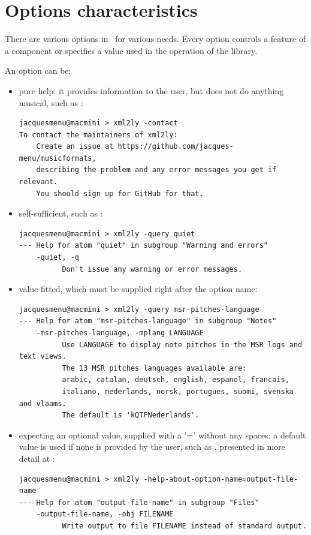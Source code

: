 \section{Options characteristics}\label{Options characteristics}

There are various options in \mf\ for various needs. Every option controls a feature of a component or specifies a value used in the operation of the library.

An option can be:
\begin{itemize}
\item pure help:
it provides information to the user, but does not do anything musical, such as :
\begin{lstlisting}[language=Terminal]
jacquesmenu@macmini > xml2ly -contact
To contact the maintainers of xml2ly:
    Create an issue at https://github.com/jacques-menu/musicformats,
    describing the problem and any error messages you get if relevant.
    You should sign up for GitHub for that.
\end{lstlisting}

\item self-sufficient, such as :
\begin{lstlisting}[language=Terminal]
jacquesmenu@macmini > xml2ly -query quiet
--- Help for atom "quiet" in subgroup "Warning and errors"
    -quiet, -q
          Don't issue any warning or error messages.
\end{lstlisting}

\item value-fitted, which must be supplied right after the option name:
\begin{lstlisting}[language=Terminal]
jacquesmenu@macmini > xml2ly -query msr-pitches-language
--- Help for atom "msr-pitches-language" in subgroup "Notes"
    -msr-pitches-language, -mplang LANGUAGE
          Use LANGUAGE to display note pitches in the MSR logs and text views.
          The 13 MSR pitches languages available are:
          arabic, catalan, deutsch, english, espanol, francais,
          italiano, nederlands, norsk, portugues, suomi, svenska and vlaams.
          The default is 'kQTPNederlands'.
\end{lstlisting}

\item expecting an optional value, supplied with a '=' without any spaces:
a default value is used if none is provided by the user, such as , presented in more detail at :
\begin{lstlisting}[language=Terminal]
jacquesmenu@macmini > xml2ly -help-about-option-name=output-file-name
--- Help for atom "output-file-name" in subgroup "Files"
    -output-file-name, -obj FILENAME
          Write output to file FILENAME instead of standard output.
\end{lstlisting}

\end{itemize}

